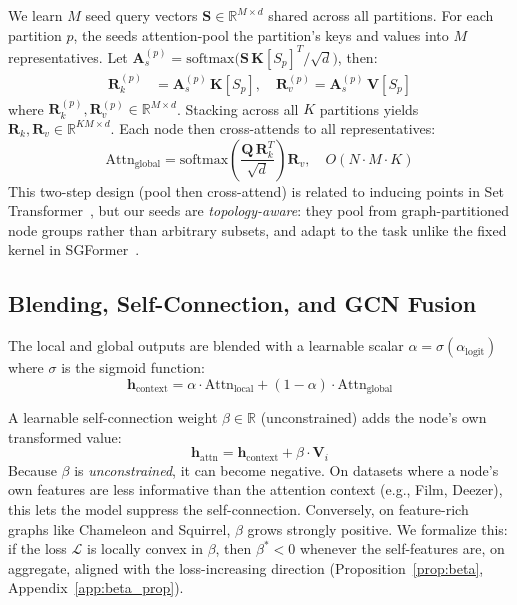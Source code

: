 We learn $M$ seed query vectors $\mathbf{S} \in \mathbb{R}^{M \times d}$ shared across all partitions. For each partition $p$, the seeds attention-pool the partition's keys and values into $M$ representatives. Let $\mathbf{A}_s^{(p)} = \mathrm{softmax}\!\bigl(\mathbf{S}\,\mathbf{K}[S_p]^T / \sqrt{d}\bigr)$, then:
\begin{align}
\mathbf{R}_k^{(p)} &= \mathbf{A}_s^{(p)}\, \mathbf{K}[S_p], \quad
\mathbf{R}_v^{(p)} = \mathbf{A}_s^{(p)}\, \mathbf{V}[S_p]
\label{eq:reps}
\end{align}
where $\mathbf{R}_k^{(p)}, \mathbf{R}_v^{(p)} \in \mathbb{R}^{M \times d}$. Stacking across all $K$ partitions yields $\mathbf{R}_k, \mathbf{R}_v \in \mathbb{R}^{KM \times d}$. Each node then cross-attends to all representatives:
\begin{equation}
\text{Attn}_{\text{global}} = \text{softmax}\left( \frac{\mathbf{Q} \, \mathbf{R}_k^T}{\sqrt{d}} \right) \mathbf{R}_v, \quad O(N \cdot M \cdot K)
\end{equation}
This two-step design (pool then cross-attend) is related to inducing points in Set Transformer~\citep{lee2019set}, but our seeds are \emph{topology-aware}: they pool from graph-partitioned node groups rather than arbitrary subsets, and adapt to the task unlike the fixed kernel in SGFormer~\citep{wu2023sgformer}.

\subsection{Blending, Self-Connection, and GCN Fusion}

The local and global outputs are blended with a learnable scalar $\alpha = \sigma(\alpha_{\text{logit}})$ where $\sigma$ is the sigmoid function:
\begin{equation}
\mathbf{h}_{\text{context}} = \alpha \cdot \text{Attn}_{\text{local}} + (1 - \alpha) \cdot \text{Attn}_{\text{global}}
\end{equation}

A learnable self-connection weight $\beta \in \mathbb{R}$ (unconstrained) adds the node's own transformed value:
\begin{equation}
\mathbf{h}_{\text{attn}} = \mathbf{h}_{\text{context}} + \beta \cdot \mathbf{V}_i
\end{equation}
Because $\beta$ is \emph{unconstrained}, it can become negative. On datasets where a node's own features are less informative than the attention context (e.g., Film, Deezer), this lets the model suppress the self-connection. Conversely, on feature-rich graphs like Chameleon and Squirrel, $\beta$ grows strongly positive. We formalize this: if the loss $\mathcal{L}$ is locally convex in $\beta$, then $\beta^* < 0$ whenever the self-features are, on aggregate, aligned with the loss-increasing direction (Proposition~\ref{prop:beta}, Appendix~\ref{app:beta_prop}).

